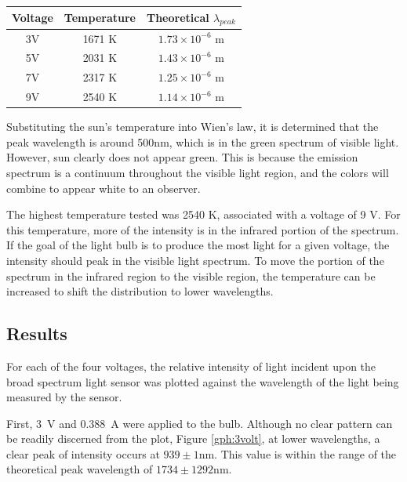\documentclass[a4paper]{article}
\begin{document}
\begin{center}
\begin{tabular}{|c|c|c|}
\hline 
Voltage & Temperature & Theoretical $\lambda_{peak}$ \topVspace \bottomVspace \\
\hline
3V & 1671 K & $1.73 \times 10^{-6}$ m \\
5V & 2031 K & $1.43 \times 10^{-6}$ m\\
7V & 2317 K & $1.25 \times 10^{-6}$ m\\
9V & 2540 K & $1.14 \times 10^{-6}$ m\\
\hline
\end{tabular}
\label{table:temps}
\end{center}

\qq Substituting the sun's temperature into Wien's law, it is determined that the peak wavelength is around 500nm, which is in the green spectrum of visible light. However, sun clearly does not appear green. This is because the emission spectrum is a continuum throughout the visible light region, and the colors will combine to appear white to an observer. 

\qq The highest temperature tested was 2540 K, associated with a voltage of 9 V. For this temperature, more of the intensity is in the infrared portion of the spectrum. If the goal of the light bulb is to produce the most light for a given voltage, the intensity should peak in the visible light spectrum. To move the portion of the spectrum in the infrared region to the visible region, the temperature can be increased to shift the distribution to lower wavelengths.

\subsection{Results}

\qq For each of the four voltages, the relative intensity of light incident upon
the broad spectrum light sensor was plotted against the wavelength of the light
being measured by the sensor.

\qq First, \SI{3}{\volt} and \SI{0.388}{\ampere} were applied to the
bulb. Although no clear pattern can be readily discerned from the plot, Figure
\ref{gph:3volt}, at lower wavelengths, a clear peak of intensity occurs at
\( 939 \pm 1 \si{\nano\meter} \). This value is within the range of the
theoretical peak wavelength of \( 1734 \pm 1292 \si{\nano\meter} \). 
\end{document}
